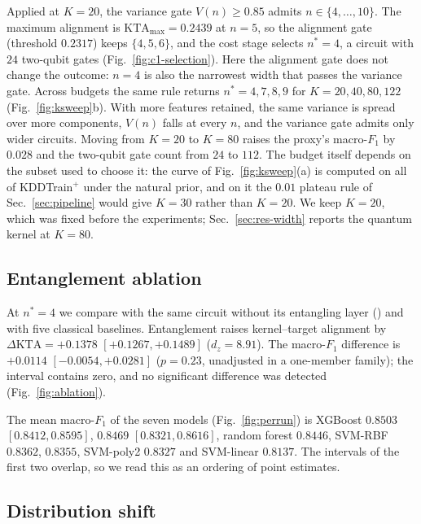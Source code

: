 Applied at $K=20$, the variance gate $V(n)\geq0.85$ admits $n\in\{4,\dots,10\}$. The maximum
alignment is $\mathrm{KTA}_{\max}=0.2439$ at $n=5$, so the alignment gate (threshold $0.2317$)
keeps $\{4,5,6\}$, and the cost stage selects $n^{\ast}=4$, a circuit with $24$ two-qubit gates
(Fig.~\ref{fig:c1-selection}). Here the alignment gate does not change the outcome: $n=4$ is
also the narrowest width that passes the variance gate. Across budgets the same rule returns $n^{\ast}=4,7,8,9$ for
$K=20,40,80,122$ (Fig.~\ref{fig:ksweep}b). With more features retained, the same variance is
spread over more components, $V(n)$ falls at every $n$, and the variance gate admits only wider
circuits. Moving from $K=20$ to $K=80$ raises the proxy's macro-$F_1$ by $0.028$ and the
two-qubit gate count from $24$ to $112$. The budget itself depends on the subset used to choose
it: the curve of Fig.~\ref{fig:ksweep}(a) is computed on all of KDDTrain$^+$ under the natural
prior, and on it the $0.01$ plateau rule of Sec.~\ref{sec:pipeline} would give $K=30$ rather than
$K=20$. We keep $K=20$, which was fixed before the experiments; Sec.~\ref{sec:res-width} reports
the quantum kernel at $K=80$.

\subsection{Entanglement ablation}\label{sec:res-ent}




At $n^{\ast}=4$ we compare \QSVM{} with the same circuit without its entangling layer
(\QSVMZ{}) and with five classical baselines. Entanglement raises kernel--target
alignment by $\Delta\mathrm{KTA}=+0.1378$ $[+0.1267,+0.1489]$ ($d_z=8.91$). The macro-$F_1$
difference is $+0.0114$ $[-0.0054,+0.0281]$ ($p=0.23$, unadjusted in a one-member family); the interval contains
zero, and no significant difference was detected (Fig.~\ref{fig:ablation}).

The mean macro-$F_1$ of the seven models (Fig.~\ref{fig:perrun}) is XGBoost $0.8503$
$[0.8412,0.8595]$, \QSVM{} $0.8469$ $[0.8321,0.8616]$, random forest $0.8446$, SVM-RBF
$0.8362$, \QSVMZ{} $0.8355$, SVM-poly2 $0.8327$ and SVM-linear $0.8137$. The intervals of
the first two overlap, so we read this as an ordering of point estimates.

\subsection{Distribution shift}\label{sec:res-shift}

